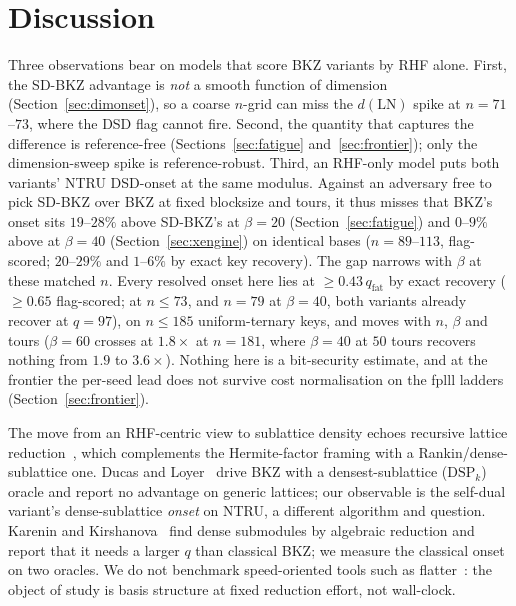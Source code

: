 \documentclass[journal=cic,version=preprint]{iacrj}
\begin{document}
\section{Discussion}
\label{sec:discussion}
Three observations bear on models that score BKZ variants by RHF alone.
First, the SD-BKZ advantage is \emph{not} a smooth function of dimension
(Section~\ref{sec:dimonset}), so a coarse $n$-grid can miss the
$d(\mathrm{LN})$ spike at $n=71$--$73$, where the DSD flag cannot fire. Second, the
quantity that captures the difference is reference-free
(Sections~\ref{sec:fatigue} and~\ref{sec:frontier}); only the dimension-sweep
spike is reference-robust. Third, an RHF-only model puts both variants' NTRU
DSD-onset at the same modulus. Against an adversary free to pick SD-BKZ over
BKZ at fixed blocksize and tours, it thus misses that BKZ's onset sits
$19$--$28\%$ above SD-BKZ's at $\beta=20$ (Section~\ref{sec:fatigue}) and
$0$--$9\%$ above at $\beta=40$ (Section~\ref{sec:xengine}) on identical
bases ($n=89$--$113$, flag-scored; $20$--$29\%$ and $1$--$6\%$ by exact key
recovery). The gap narrows with $\beta$ at these matched $n$. Every resolved
onset here lies at ${\ge}0.43\,q_\mathrm{fat}$ by exact recovery
(${\ge}0.65$ flag-scored; at $n\le73$, and $n=79$ at $\beta=40$, both
variants already recover at $q=97$), on $n\le185$ uniform-ternary keys, and moves with
$n$, $\beta$ and tours ($\beta=60$ crosses at $1.8\times$ at $n=181$, where
$\beta=40$ at $50$ tours recovers nothing from $1.9$ to $3.6\times$).
Nothing here is a bit-security estimate, and at the frontier the per-seed lead does not
survive cost normalisation on the fplll ladders (Section~\ref{sec:frontier}).

The move from an RHF-centric view to
sublattice density echoes recursive lattice
reduction~\cite{RecursiveReduction2023}, which complements the Hermite-factor
framing with a Rankin/dense-sublattice one. Ducas and Loyer~\cite{DucasLoyer2025} drive BKZ with a
densest-sublattice ($\mathrm{DSP}_k$) oracle and report no advantage on
generic lattices; our observable is the self-dual variant's dense-sublattice
\emph{onset} on NTRU, a different algorithm and question. Karenin and
Kirshanova~\cite{KareninKirshanova2024} find dense submodules by algebraic
reduction and report that it needs a larger $q$ than classical BKZ; we measure
the classical onset on two oracles. We do not benchmark speed-oriented tools
such as \textsf{flatter}~\cite{RyanHeninger2023}: the object of study is basis
structure at fixed reduction effort, not wall-clock.
\end{document}
